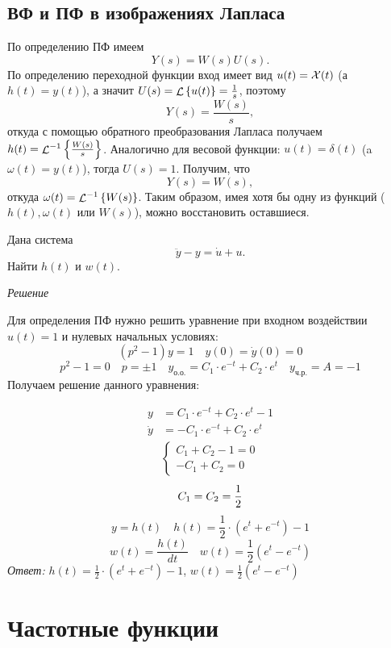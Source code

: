 \documentclass[../../TAU.tex]{subfiles}
\begin{document}
\subsection{ВФ и ПФ в изображениях Лапласа }

    По определению ПФ имеем
    $$
        Y(s) = W(s)U(s).
    $$
    По определению переходной функции вход имеет вид 
    $u(t) = \mathcal{X}(t)$ 
    (а~$h(t) = y(t)$), а значит 
    $U(s) = \mathop{\mathcal{L}}\nolimits\left\{u(t)\right\} = \frac{1}{s}$, поэтому
    $$
        Y(s) = \frac{W(s)}{s},
    $$
    откуда с помощью обратного преобразования Лапласа получаем 
    $h(t) = {\mathop{\mathcal{L}}\nolimits^{-1}\left\{\frac{W(s)}{s}\right\}}$.
    Аналогично для весовой функции: 
    $u(t) = \delta(t)$ 
    (a $\omega(t) = y(t)$), тогда $U(s)=1$. Получим, что
    $$
        Y(s) = W(s),
    $$
    откуда 
    $\omega(t) = {\mathop{\mathcal{L}}\nolimits^{-1}\left\{W(s)\right\}}$.
    Таким образом, имея хотя бы одну из функций ($h(t), \omega(t)$ или $W(s)$), можно восстановить оставшиеся.

    \examp Дана система
    $$
        \ddot y - y = \dot u + u.
    $$
    Найти $h(t)$ и $w(t)$.

    \textit{Решение}

    Для определения ПФ нужно решить уравнение при входном воздействии $u(t)=1$ и нулевых начальных условиях:
    $$
        (p^2-1)y=1\quad y(0)=\dot y(0)=0
    $$
    $$
        p^2-1=0\quad p=\pm1\quad y_\text{о.о.}=C_1\cdot e^{-t}+C_2\cdot e^t\quad y_\text{ч.р.}=A=-1
    $$
    Получаем решение данного уравнения:

    \begin{align*}
        y &= C_1\cdot e^{-t}+C_2\cdot e^t-1     \\
        \dot y &= -C_1\cdot e^{-t}+C_2\cdot e^t
    \end{align*}
    \begin{align*}
        \begin{cases}
          C_1+C_2-1 = 0\\
         -C_1+C_2   = 0
        \end{cases}
    \end{align*}
    \[
        C_1=C_2={1\over2}
    \]
    \[
        y=h(t) \quad h(t)=\frac{1}{2}\cdot(e^t+e^{-t})-1
    \]
    \[
        w(t)=\frac{h(t)}{dt} \quad w(t)=\frac{1}{2}(e^t-e^{-t})
    \]
    \textit{Ответ:}
    $h(t)=\frac{1}{2}\cdot(e^t+e^{-t})-1$, $w(t)=\frac{1}{2}(e^t-e^{-t})$

\section{Частотные функции}
\end{document}
